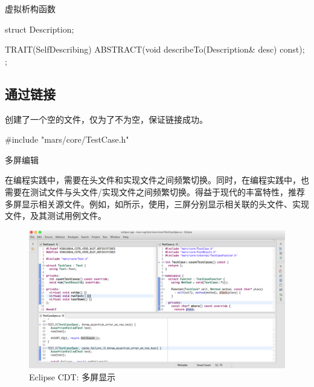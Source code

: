 \begin{content}
\begin{episode}{虚拟析构函数}
\begin{content}
\begin{c++}
struct Description;

TRAIT(SelfDescribing) {
  ABSTRACT(void describeTo(Description& desc) const);
};
\end{c++}

\end{content}

\end{episode}

\subsection{通过链接}

创建了一个空的文件，仅为了不为空，保证链接成功。

\begin{leftbar}
 \begin{c++}[caption={\ttfamily{src/mars/core/TestCase.cc}}]
#include "mars/core/TestCase.h"
 \end{c++}
\end{leftbar}


\begin{episode}{多屏编辑}

\begin{content}

在\cpp{}编程实践中，需要在头文件和实现文件之间频繁切换。同时，在编程实践中，也需要在测试文件与头文件/实现文件之间频繁切换。得益于现代的丰富特性，推荐多屏显示相关源文件。例如，如所示，使用，三屏分别显示相关联的头文件、实现文件，及其测试用例文件。

\begin{figure}[H]
\centering
\includegraphics[width=1.0\textwidth]{figures/xunit/multi-editor-eclipse.png}
\caption{Eclipse CDT: 多屏显示}
 \label{fig:multi-editor-eclipse}
\end{figure}


\end{content}
\end{episode}
\end{content}
